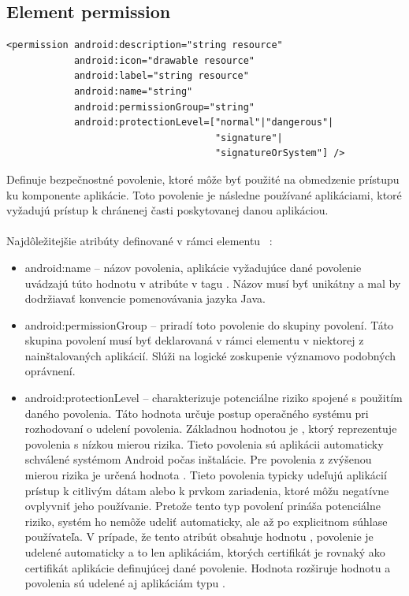 \subsection{Element permission}
\lstset{language=XML}
\begin{lstlisting}
<permission android:description="string resource"
            android:icon="drawable resource"
            android:label="string resource"
            android:name="string"
            android:permissionGroup="string"
            android:protectionLevel=["normal"|"dangerous"| 
                                     "signature"|
                                     "signatureOrSystem"] />
\end{lstlisting}
Definuje bezpečnostné povolenie, ktoré môže byť použité na obmedzenie prístupu ku komponente aplikácie. Toto povolenie je následne používané aplikáciami, ktoré vyžadujú prístup k chránenej časti poskytovanej danou aplikáciou.\\\\ Najdôležitejšie atribúty definované v rámci elementu ~\cite{elPerm}:\\
\begin{itemize}
\item android:name – názov povolenia, aplikácie vyžadujúce dané povolenie uvádzajú túto hodnotu v atribúte  v tagu . Názov musí byť unikátny a mal by dodržiavať konvencie pomenovávania jazyka Java.
\item android:permissionGroup – priradí toto povolenie do skupiny povolení. Táto skupina povolení musí byť deklarovaná v rámci elementu  v niektorej z nainštalovaných aplikácií. Slúži na logické zoskupenie významovo podobných oprávnení.
\item android:protectionLevel – charakterizuje potenciálne riziko spojené s použitím daného povolenia. Táto hodnota určuje postup operačného systému pri rozhodovaní o udelení povolenia. 
Základnou hodnotou je , ktorý reprezentuje povolenia s nízkou mierou rizika. Tieto povolenia sú aplikácii automaticky schválené systémom Android počas inštalácie. Pre povolenia z zvýšenou mierou rizika je určená hodnota . Tieto povolenia typicky udeľujú aplikácií prístup k citlivým dátam alebo k prvkom zariadenia, ktoré môžu negatívne ovplyvniť jeho používanie. Pretože tento typ povolení prináša potenciálne riziko, systém ho nemôže udeliť automaticky, ale až po explicitnom súhlase používateľa.
V prípade, že tento atribút obsahuje hodnotu , povolenie je udelené automaticky a to len aplikáciám, ktorých certifikát je rovnaký ako certifikát aplikácie definujúcej dané povolenie.   
Hodnota  rozširuje hodnotu  a povolenia sú udelené aj aplikáciám typu .
\end{itemize}

